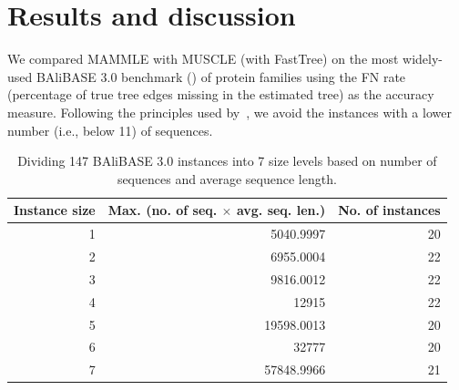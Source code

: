 \section{Results and discussion }
We compared MAMMLE with MUSCLE (with FastTree) on the most widely-used BAliBASE 3.0 benchmark (\cite{thompson2005balibase}) of protein families using the FN rate (percentage of true tree edges missing in the estimated tree) as the accuracy measure. Following the principles used by~\cite{mirarab2015pasta}, we avoid the instances with a lower number (i.e., below 11) of sequences. %

\begin{table}[htbp]
	\centering
	\caption{Dividing 147 BAliBASE 3.0 instances into 7 size levels based on number of sequences and average sequence length.}
	\begin{tabular}{r|r|r}
		\multicolumn{1}{l|}{Instance size} & \multicolumn{1}{l|}{Max. (no. of seq. $\times$ avg. seq. len.)} & No. of instances\\
		\hline
		1     & 5040.9997 & 20 \\
		\hline
		2     & 6955.0004 & 22 \\
		\hline
		3     & 9816.0012 & 22 \\
		\hline
		4     & 12915 & 22 \\
		\hline
		5     & 19598.0013 & 20 \\
		\hline
		6     & 32777 & 20 \\
		\hline
		7     & 57848.9966 & 21\\
		\hline
	\end{tabular}%
	\label{tab:data-size}%
\end{table}%

